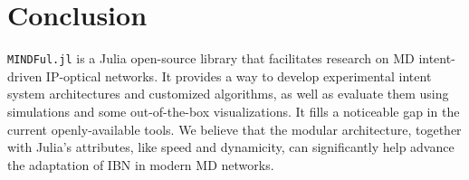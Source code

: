 \documentclass{juliacon}
\begin{document}
\section{Conclusion}
\verb|MINDFul.jl| is a Julia open-source library that facilitates research on \ac{MD} intent-driven IP-optical networks.
It provides a way to develop experimental intent system architectures and customized algorithms, as well as evaluate them using simulations and some out-of-the-box visualizations.
It fills a noticeable gap in the current openly-available tools.
We believe that the modular architecture, together with Julia's attributes, like speed and dynamicity, can significantly help advance the adaptation of \ac{IBN} in modern \ac{MD} networks.



%




\end{document}
